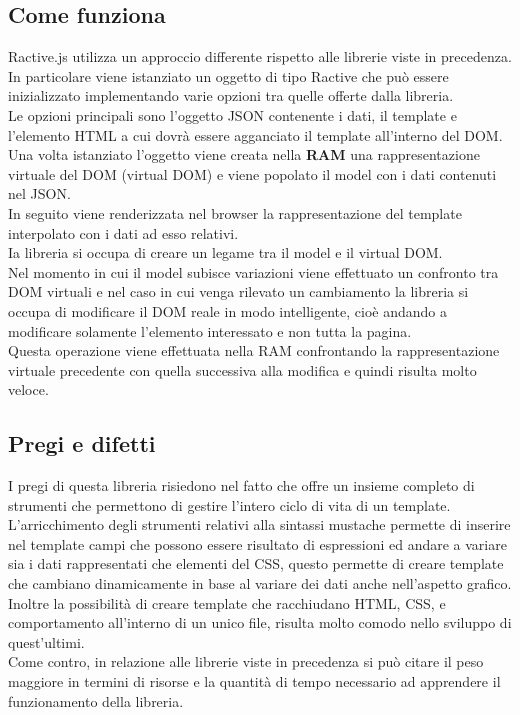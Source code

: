 \subsection{Come funziona}
Ractive.js utilizza un approccio differente rispetto alle librerie viste in precedenza.\\
In particolare viene istanziato un oggetto di tipo Ractive che può essere inizializzato implementando varie opzioni tra quelle offerte dalla libreria.\\
Le opzioni principali sono l'oggetto JSON contenente i dati, il template e l'elemento HTML a cui dovrà essere agganciato il template all'interno del DOM.\\
Una volta istanziato l'oggetto viene creata nella \textbf{RAM} una rappresentazione virtuale del DOM (virtual DOM) e viene popolato il model con i dati contenuti nel JSON.\\
In seguito viene renderizzata nel browser la rappresentazione del template interpolato con i dati ad esso relativi.\\
Ia libreria si occupa di creare un legame tra il model e il virtual DOM.\\
Nel momento in cui il model subisce variazioni viene effettuato un confronto tra DOM virtuali e nel caso in cui  venga rilevato un cambiamento la libreria si occupa di modificare il DOM reale in modo intelligente, cioè andando a modificare solamente l'elemento interessato e non tutta la pagina.\\
Questa operazione viene effettuata  nella RAM confrontando la rappresentazione virtuale precedente con quella successiva alla modifica e quindi risulta molto veloce.

\subsection{Pregi e difetti}
I pregi di questa libreria risiedono nel fatto che offre un insieme completo di strumenti che permettono di gestire l'intero ciclo di vita di un template.\\
L'arricchimento degli strumenti relativi alla sintassi mustache permette di inserire nel template campi che possono essere risultato di espressioni ed andare a variare sia i dati rappresentati che elementi del CSS, questo permette di creare template che cambiano dinamicamente in base al variare dei dati anche nell'aspetto grafico.\\
Inoltre la possibilità di creare template che racchiudano HTML, CSS, e comportamento all'interno di un unico file, risulta molto comodo nello sviluppo di quest'ultimi.\\  
Come contro, in relazione alle librerie viste in precedenza si può citare il peso maggiore in termini di risorse e la quantità di tempo necessario ad apprendere il funzionamento della libreria.


